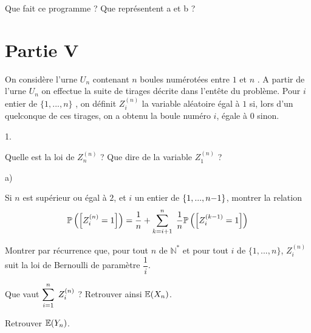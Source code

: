 \documentclass[11pt]{article}%
\begin{document}
\noindent Que fait ce programme ? Que représentent a et b ?

\section*{Partie V}
\noindent
On considère l'urne $U_{n}$ contenant $n$ boules numérotées entre $1$ et 
$n$%
. A partir de l'urne $U_{n}$ on effectue la suite de tirages décrite 
dans
l'en{\-}tête du problème. Pour $i$ entier de ${\{}1,...,n{\}}$ , on 
définit $%
Z_{i}^{(n)}$ la variable aléatoire égal à $1$ si, lors d'un quelconque 
de
ces tirages, on a obtenu la boule numéro $i$, égale à $0$ sinon.

\begin{noliste}{1.}
\item Quelle est la loi de $Z_{n}^{(n)}$ ? Que dire de la variable $%
Z_{1}^{(n)}$ ?

\item 
\begin{noliste}{a)}
\item Si $n$ est supérieur ou égal à $2$, et $i$ un entier de 
${\{}1,...,n{-}1{%
\}}$, montrer la relation%
\[
\Prob\left(\Ev{Z_{i}^{(n)}=1}\right) 
=\dfrac{1}{n}+\DSum{k=i+1}{n}\dfrac{1}{n%
}\Prob\left(\Ev{Z_{i}^{(k-1)}=1}\right)
\]

\item Montrer par récurrence que, pour tout $n$ de $\mathbb{N}^*$ 
et
pour tout $i$ de ${\{}1,...,n{\}}$, $Z_{i}^{(n)}$ suit la loi de 
Bernoulli
de paramètre $\dfrac{1}{i}$.
\end{noliste}

\item Que vaut $\displaystyle\sum\limits_{i=1}^{n}\hspace{.1cm}Z_{i}^{(n)}$ ? Retrouver ainsi $%
\E(X_{n}) $.

\item Retrouver $\mathbb{E}(Y_{n})$.
\end{noliste}
\end{document}
